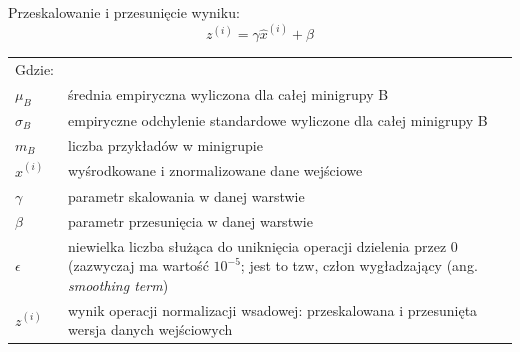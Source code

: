 \documentclass[a4paper,11pt]{article}
\begin{document}
    \smallskip

    \noindent
    \begin{minipage}[H]{\textwidth}
        \setlength\parindent{17pt} Przeskalowanie i przesunięcie wyniku: \\
        \begin{equation}
            \label{eq:rescaling_and_translating_result}
            z^{(i)} = \gamma\widehat{x}^{(i)} + \beta
        \end{equation}
    \end{minipage}

    \smallskip

    \begin{tabular}{p{}p{}}
        Gdzie: \\
        $\mu_{B}$           & średnia empiryczna wyliczona dla całej minigrupy B                                                                                                                \\
        $\sigma_{B}$        & empiryczne odchylenie standardowe wyliczone dla całej minigrupy B                                                                                                 \\
        $m_{B}$             & liczba przykładów w minigrupie                                                                                                                                    \\
        $\widehat{x}^{(i)}$ & wyśrodkowane i znormalizowane dane wejściowe                                                                                                                      \\
        $\gamma$            & parametr skalowania w danej warstwie                                                                                                                              \\
        $\beta$             & parametr przesunięcia w danej warstwie                                                                                                                            \\
        $\epsilon$          & niewielka liczba służąca do uniknięcia operacji dzielenia przez 0 (zazwyczaj ma wartość $10^{-5}$; jest to tzw, człon wygładzający (ang. \textit{smoothing term}) \\
        $z^{(i)}$           & wynik operacji normalizacji wsadowej: przeskalowana i przesunięta wersja danych wejściowych                                                                       \\
    \end{tabular}
\end{document}
